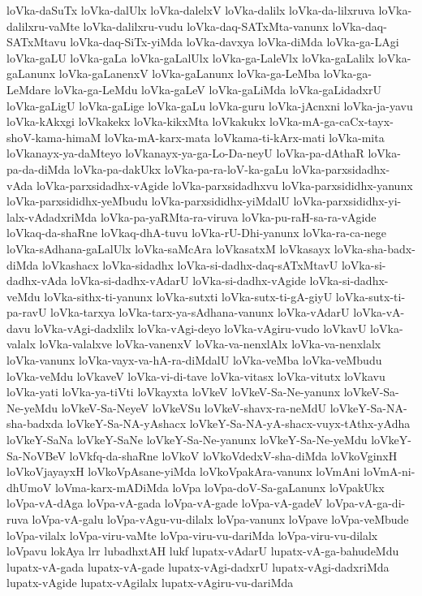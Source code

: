 {loVka-daSuTx
loVka-dalUlx
loVka-dalelxV
loVka-dalilx
loVka-da-lilxruva
loVka-dalilxru-vaMte
loVka-dalilxru-vudu
loVka-daq-SATxMta-vanunx
loVka-daq-SATxMtavu
loVka-daq-SiTx-yiMda
loVka-davxya
loVka-diMda
loVka-ga-LAgi
loVka-gaLU
loVka-gaLa
loVka-gaLalUlx
loVka-ga-LaleVlx
loVka-gaLalilx
loVka-gaLanunx
loVka-gaLanenxV
loVka-gaLanunx
loVka-ga-LeMba
loVka-ga-LeMdare
loVka-ga-LeMdu
loVka-gaLeV
loVka-gaLiMda
loVka-gaLidadxrU
loVka-gaLigU
loVka-gaLige
loVka-gaLu
loVka-guru
loVka-jAcnxni
loVka-ja-yavu
loVka-kAkxgi
loVkakekx
loVka-kikxMta
loVkakukx
loVka-mA-ga-caCx-tayx-shoV-kama-himaM
loVka-mA-karx-mata
loVkama-ti-kArx-mati
loVka-mita
loVkanayx-ya-daMteyo
loVkanayx-ya-ga-Lo-Da-neyU
loVka-pa-dAthaR
loVka-pa-da-diMda
loVka-pa-dakUkx
loVka-pa-ra-loV-ka-gaLu
loVka-parxsidadhx-vAda
loVka-parxsidadhx-vAgide
loVka-parxsidadhxvu
loVka-parxsididhx-yanunx
loVka-parxsididhx-yeMbudu
loVka-parxsididhx-yiMdalU
loVka-parxsididhx-yi-lalx-vAdadxriMda
loVka-pa-yaRMta-ra-viruva
loVka-pu-raH-sa-ra-vAgide
loVkaq-da-shaRne
loVkaq-dhA-tuvu
loVka-rU-Dhi-yanunx
loVka-ra-ca-nege
loVka-sAdhana-gaLalUlx
loVka-saMcAra
loVkasatxM
loVkasayx
loVka-sha-badx-diMda
loVkashacx
loVka-sidadhx
loVka-si-dadhx-daq-sATxMtavU
loVka-si-dadhx-vAda
loVka-si-dadhx-vAdarU
loVka-si-dadhx-vAgide
loVka-si-dadhx-veMdu
loVka-sithx-ti-yanunx
loVka-sutxti
loVka-sutx-ti-gA-giyU
loVka-sutx-ti-pa-ravU
loVka-tarxya
loVka-tarx-ya-sAdhana-vanunx
loVka-vAdarU
loVka-vA-davu
loVka-vAgi-dadxlilx
loVka-vAgi-deyo
loVka-vAgiru-vudo
loVkavU
loVka-valalx
loVka-valalxve
loVka-vanenxV
loVka-va-nenxlAlx
loVka-va-nenxlalx
loVka-vanunx
loVka-vayx-va-hA-ra-diMdalU
loVka-veMba
loVka-veMbudu
loVka-veMdu
loVkaveV
loVka-vi-di-tave
loVka-vitasx
loVka-vitutx
loVkavu
loVka-yati
loVka-ya-tiVti
loVkayxta
loVkeV
loVkeV-Sa-Ne-yanunx
loVkeV-Sa-Ne-yeMdu
loVkeV-Sa-NeyeV
loVkeVSu
loVkeV-shavx-ra-neMdU
loVkeY-Sa-NA-sha-badxda
loVkeY-Sa-NA-yAshacx
loVkeY-Sa-NA-yA-shacx-vuyx-tAthx-yAdha
loVkeY-SaNa
loVkeY-SaNe
loVkeY-Sa-Ne-yanunx
loVkeY-Sa-Ne-yeMdu
loVkeY-Sa-NoVBeV
loVkfq-da-shaRne
loVkoV
loVkoVdedxV-sha-diMda
loVkoVginxH
loVkoVjayayxH
loVkoVpAsane-yiMda
loVkoVpakAra-vanunx
loVmAni
loVmA-ni-dhUmoV
loVma-karx-mADiMda
loVpa
loVpa-doV-Sa-gaLanunx
loVpakUkx
loVpa-vA-dAga
loVpa-vA-gada
loVpa-vA-gade
loVpa-vA-gadeV
loVpa-vA-ga-di-ruva
loVpa-vA-galu
loVpa-vAgu-vu-dilalx
loVpa-vanunx
loVpave
loVpa-veMbude
loVpa-vilalx
loVpa-viru-vaMte
loVpa-viru-vu-dariMda
loVpa-viru-vu-dilalx
loVpavu
lokAya
lrr
lubadhxtAH
lukf
lupatx-vAdarU
lupatx-vA-ga-bahudeMdu
lupatx-vA-gada
lupatx-vA-gade
lupatx-vAgi-dadxrU
lupatx-vAgi-dadxriMda
lupatx-vAgide
lupatx-vAgilalx
lupatx-vAgiru-vu-dariMda
}
